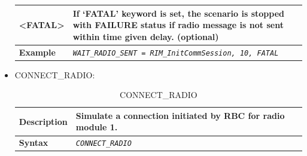 \begin{itemize}
\begin{longtable}{|l|l|l|}
				\hline

					\begin{minipage}[t]{0.22\linewidth} \textbf{<FATAL>} \end{minipage}
				&	\multicolumn{2}{l|}{	\begin{minipage}[t]{0.78\linewidth}	If ‘FATAL’ keyword is set, the scenario is stopped with FAILURE status if radio message is not sent within time given delay. (optional)	\end{minipage} } \\

				\hline

					\begin{minipage}[t]{0.22\linewidth} \textbf{Example} \end{minipage}
				&	\multicolumn{2}{l|}{ \begin{minipage}[t]{0.78\linewidth} \emph{\texttt{WAIT\_RADIO\_SENT = RIM\_InitCommSession, 10, FATAL}} \end{minipage} } \\

				\hline \hline

			\end{longtable}

		\item CONNECT\_RADIO:

			\begin{longtable}{|l|l|}
				\caption{CONNECT\_RADIO}\\
				\hline

					\begin{minipage}[t]{0.22\linewidth} \textbf{Description} \end{minipage}
				&	\begin{minipage}[t]{0.78\linewidth} Simulate a connection initiated by RBC for radio module 1. \end{minipage} \\

				\hline

					\begin{minipage}[t]{0.22\linewidth} \textbf{Syntax} \end{minipage}
				&	\begin{minipage}[t]{0.78\linewidth} \emph{\texttt{CONNECT\_RADIO}} \end{minipage} \\

				\hline \hline

			\end{longtable}


\end{itemize}
